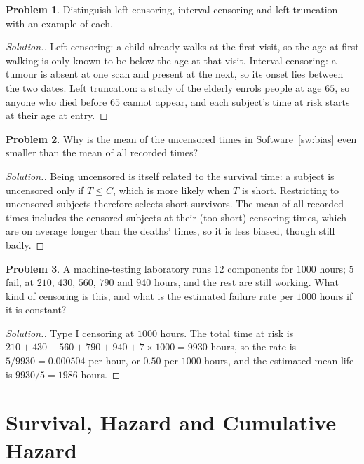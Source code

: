 \documentclass[11pt,a4paper]{article}
\numberwithin{equation}{section}
\theoremstyle{definition}
\newtheorem{problemx}{Problem}[subsection]
\newenvironment{problem}{\begin{problemx}}{\end{problemx}}
\newenvironment{solution}
  {\renewcommand{\qedsymbol}{}\begin{proof}[\textit{Solution}.]}
  {\end{proof}}
\begin{document}
\begin{problem}
Distinguish left censoring, interval censoring and left truncation with an example of each.
\end{problem}

\begin{solution}
Left censoring: a child already walks at the first visit, so the age at first walking is only known to be below the age at that visit. Interval censoring: a tumour is absent at one scan and present at the next, so its onset lies between the two dates. Left truncation: a study of the elderly enrols people at age $65$, so anyone who died before $65$ cannot appear, and
each subject's time at risk starts at their age at entry.
\end{solution}

\begin{problem}
Why is the mean of the uncensored times in Software~\ref{sw:bias} even smaller than the mean of all recorded times?
\end{problem}

\begin{solution}
Being uncensored is itself related to the survival time: a subject is uncensored only if $T \leq C$, which is more likely when $T$ is short. Restricting to uncensored subjects therefore selects short survivors. The mean of all recorded times includes the censored subjects at their (too short) censoring times, which are on average longer than the deaths' times, so it is less
biased, though still badly.
\end{solution}

\begin{problem}
A machine-testing laboratory runs $12$ components for $1000$ hours; $5$ fail, at $210$, $430$, $560$, $790$ and $940$ hours, and the rest are still working. What kind of censoring is this, and what is the estimated failure rate per $1000$ hours if it is constant?
\end{problem}

\begin{solution}
Type I censoring at $1000$ hours. The total time at risk is $210 + 430 + 560 + 790 + 940 + 7 \times 1000 = 9930$ hours, so the rate is $5/9930 = 0.000504$ per hour, or $0.50$ per $1000$ hours, and the estimated mean life is $9930/5 = 1986$ hours.
\end{solution}

\section{Survival, Hazard and Cumulative Hazard}
\label{sec:functions}
\end{document}

